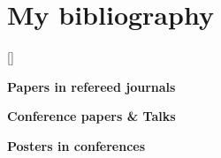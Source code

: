 \documentclass[a4paper,10pt]{article} %
\begin{document}
\section{My bibliography}

{\begin{enumerate}
{\setlength{\leftmargin}{\bibhang}%
\setlength{\itemindent}{-\leftmargin}%
\setlength{\itemsep}{\bibitemsep}%
\setlength{\parsep}{\bibparsep}}}
{\end{enumerate}}
{\item}

[\bibname]{ }

\nocite{*}

{\bf Papers in refereed journals}
\printbibliography[type=article]

{\bf Conference papers \& Talks}
\printbibliography[type=inproceedings]

{\bf Posters in conferences}
\printbibliography[type=proceedings]
\end{document}
